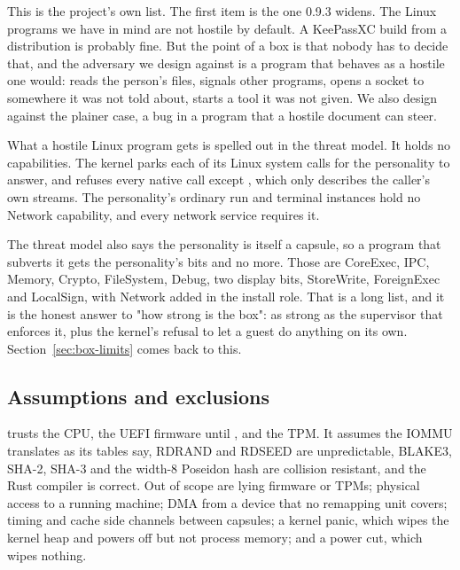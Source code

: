 This is the project's own list. The first item is the one 0.9.3 widens. The Linux programs we have in mind are not hostile by default. A KeePassXC build from a distribution is probably fine. But the point of a box is that nobody has to decide that, and the adversary we design against is a program that behaves as a hostile one would: reads the person's files, signals other programs, opens a socket to somewhere it was not told about, starts a tool it was not given. We also design against the plainer case, a bug in a program that a hostile document can steer.

What a hostile Linux program gets is spelled out in the threat model. It holds no capabilities. The kernel parks each of its Linux system calls for the personality to answer, and refuses every native call except , which only describes the caller's own streams. The personality's ordinary run and terminal instances hold no Network capability, and every network service requires it.

The threat model also says the personality is itself a capsule, so a program that subverts it gets the personality's bits and no more. Those are CoreExec, IPC, Memory, Crypto, FileSystem, Debug, two display bits, StoreWrite, ForeignExec and LocalSign, with Network added in the install role. That is a long list, and it is the honest answer to "how strong is the box": as strong as the supervisor that enforces it, plus the kernel's refusal to let a guest do anything on its own. Section~\ref{sec:box-limits} comes back to this.

\subsection{Assumptions and exclusions}

\nonos{} trusts the CPU, the UEFI firmware until , and the TPM. It assumes the IOMMU translates as its tables say, RDRAND and RDSEED are unpredictable, BLAKE3, SHA-2, SHA-3 and the width-8 Poseidon hash are collision resistant, and the Rust compiler is correct. Out of scope are lying firmware or TPMs; physical access to a running machine; DMA from a device that no remapping unit covers; timing and cache side channels between capsules; a kernel panic, which wipes the kernel heap and powers off but not process memory; and a power cut, which wipes nothing.

